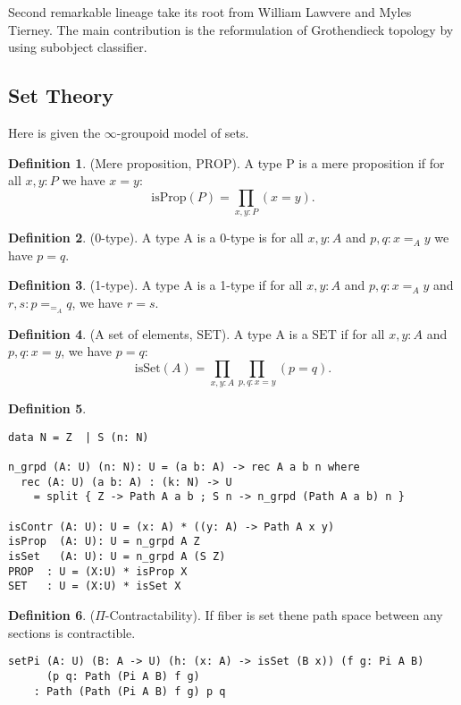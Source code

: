 \documentclass{article}
\theoremstyle{definition}
\newtheorem{definition}{Definition}
\begin{document}
Second remarkable lineage take its root from William Lawvere and
Myles Tierney. The main contribution is the reformulation of Grothendieck topology
by using subobject classifier.

\subsection{Set Theory}

Here is given the $\infty$-groupoid model of sets.

\begin{definition} (Mere proposition, $\mathrm{PROP}$).
A type P is a mere proposition if for all $x,y: P$ we have $x=y$:
$$
    \mathrm{isProp}(P) = \prod_{x,y:P}(x=y).
$$
\end{definition}

\begin{definition} (0-type).
A type A is a 0-type is for all $x,y: A$ and $p,q: x =_A y$ we have $p = q$.
\end{definition}

\begin{definition} (1-type).
A type A is a 1-type if for all $x,y: A$ and $p,q: x =_A y$ and $r,s:p =_{=_A} q$, we have $r = s$.
\end{definition}

\begin{definition} (A set of elements, $\mathrm{SET}$).
A type A is a $\mathrm{SET}$ if for all $x,y: A$ and $p,q: x = y$, we have $p = q$:
$$
    \mathrm{isSet}(A) = \prod_{x,y:A}\prod_{p,q:x=y}(p=q).
$$
\end{definition}

\begin{definition}
\begin{lstlisting}
data N = Z  | S (n: N)

n_grpd (A: U) (n: N): U = (a b: A) -> rec A a b n where
  rec (A: U) (a b: A) : (k: N) -> U
    = split { Z -> Path A a b ; S n -> n_grpd (Path A a b) n }

isContr (A: U): U = (x: A) * ((y: A) -> Path A x y)
isProp  (A: U): U = n_grpd A Z
isSet   (A: U): U = n_grpd A (S Z)
PROP  : U = (X:U) * isProp X
SET   : U = (X:U) * isSet X
\end{lstlisting}
\end{definition}

\begin{definition} ($\Pi$-Contractability).
If fiber is set thene path space between any sections is contractible.
\begin{lstlisting}
setPi (A: U) (B: A -> U) (h: (x: A) -> isSet (B x)) (f g: Pi A B)
      (p q: Path (Pi A B) f g)
    : Path (Path (Pi A B) f g) p q
\end{lstlisting}
\end{definition}
\end{document}
